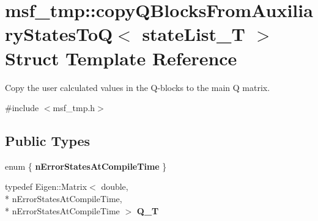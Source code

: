 \hypertarget{structmsf__tmp_1_1copyQBlocksFromAuxiliaryStatesToQ}{\section{msf\-\_\-tmp\-:\-:copy\-Q\-Blocks\-From\-Auxiliary\-States\-To\-Q$<$ state\-List\-\_\-\-T $>$ Struct Template Reference}
\label{structmsf__tmp_1_1copyQBlocksFromAuxiliaryStatesToQ}
}


Copy the user calculated values in the Q-\/blocks to the main Q matrix.  




{\ttfamily \#include $<$msf\-\_\-tmp.\-h$>$}

\subsection*{Public Types}
\begin{DoxyCompactItemize}
\item 
enum \{ {\bfseries n\-Error\-States\-At\-Compile\-Time}
 \}
\item 
\hypertarget{structmsf__tmp_1_1copyQBlocksFromAuxiliaryStatesToQ_ae129639a59b673f01724af984fde8c2c}{typedef Eigen\-::\-Matrix$<$ double, \\*
n\-Error\-States\-At\-Compile\-Time, \\*
n\-Error\-States\-At\-Compile\-Time $>$ {\bfseries Q\-\_\-\-T}}\label{structmsf__tmp_1_1copyQBlocksFromAuxiliaryStatesToQ_ae129639a59b673f01724af984fde8c2c}

\end{DoxyCompactItemize}
